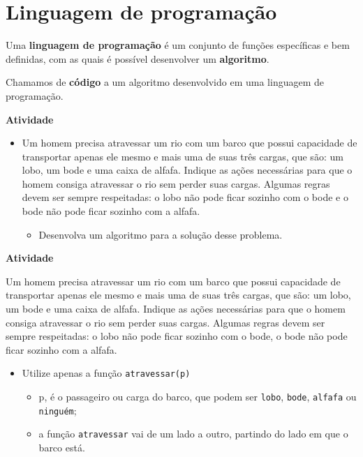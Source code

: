 \documentclass[
  letterpaper,
  DIV=11,
  numbers=noendperiod]{scrreprt}
\providecommand{\tightlist}{%
  \setlength{\itemsep}{0pt}\setlength{\parskip}{0pt}}\usepackage{longtable,booktabs,array}
\begin{document}

\chapter{Linguagem de programação}\label{linguagem-de-programauxe7uxe3o}

Uma \textbf{linguagem de programação} é um conjunto de funções
específicas e bem definidas, com as quais é possível desenvolver um
\textbf{algoritmo}.

Chamamos de \textbf{código} a um algoritmo desenvolvido em uma linguagem
de programação.

\textbf{Atividade}

\begin{itemize}
\tightlist
\item
  Um homem precisa atravessar um rio com um barco que possui capacidade
  de transportar apenas ele mesmo e mais uma de suas três cargas, que
  são: um lobo, um bode e uma caixa de alfafa. Indique as ações
  necessárias para que o homem consiga atravessar o rio sem perder suas
  cargas. Algumas regras devem ser sempre respeitadas: o lobo não pode
  ficar sozinho com o bode e o bode não pode ficar sozinho com a alfafa.

  \begin{itemize}
  \tightlist
  \item
    Desenvolva um algoritmo para a solução desse problema.
  \end{itemize}
\end{itemize}

\textbf{Atividade}

Um homem precisa atravessar um rio com um barco que possui capacidade de
transportar apenas ele mesmo e mais uma de suas três cargas, que são: um
lobo, um bode e uma caixa de alfafa. Indique as ações necessárias para
que o homem consiga atravessar o rio sem perder suas cargas. Algumas
regras devem ser sempre respeitadas: o lobo não pode ficar sozinho com o
bode, o bode não pode ficar sozinho com a alfafa.

\begin{itemize}
\tightlist
\item
  Utilize apenas a função \texttt{atravessar(p)}

  \begin{itemize}
  \tightlist
  \item
    p, é o passageiro ou carga do barco, que podem ser \texttt{lobo},
    \texttt{bode}, \texttt{alfafa} ou \texttt{ninguém};
  \item
    a função \texttt{atravessar} vai de um lado a outro, partindo do
    lado em que o barco está.
  \end{itemize}
\end{itemize}
\end{document}
